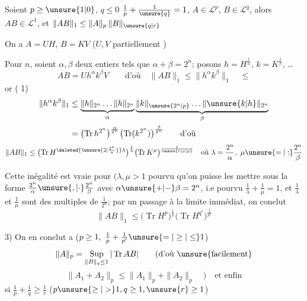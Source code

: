  Soient $p\geq\unsure{1|0}$,
$q\leq0$ \quad $\frac1p+\frac1{\unsure{q}}=1$,
$A\in\mathcal L^p$, $B\in\mathcal L^q$, alors $AB\in\mathcal L^1$, et
$\|AB\|_1\leq\|A\|_p\,\|B\|_{\unsure{q|r}}$

On a $A=UH$, $B=KV$ ($U,V$ partiellement )

Pour  $n$, soient $\alpha,\beta$ deux entiers tels que $\alpha+\beta=2^n$;
posons $h=H^{\frac1\alpha}$, $k=K^{\frac1\beta}$, \ldots
\[
AB=Uh^\alpha k^\beta V\qquad\text{d'où}\quad\|AB\|_1\leq\|h^\alpha k^\beta\|_1\quad\leq
\]
or ( 1)
\[
\begin{aligned}
\|h^\alpha k^\beta\|_1&\leq
\underbrace{\|h\|_{2^n}\ldots\|h\|_{2^n}}_{\alpha}
\underbrace{\|k\|_{\unsure{2^n|p}}\ldots\|\unsure{k|h}\|_{2^n}}_{\beta}\\
&=\bigl(\operatorname{Tr} h^{2^n}\bigr)^{\frac\alpha{2^n}}
\bigl(\operatorname{Tr}(k^{2^n})\bigr)^{\frac\beta{2^n}}\qquad\text{d'où}
\end{aligned}
\]
\[
\|AB\|_1\leq\bigl(\operatorname{Tr}H^{\deleted{\unsure{2|\frac{2^n}{\alpha}}}\lambda}\bigr)^{\frac1\lambda}
\bigl(\operatorname{Tr}K^\mu\bigr)^{\frac1{\unsure{r|\mu|p}}}
\quad\text{où }\lambda=\frac{2^n}{\alpha},\ \mu\unsure{=|:}\frac{2^n}{\beta}
\]

Cette inégalité est vraie pour  $(\lambda,\mu>1$ pourvu qu'on puisse les mettre sous la  forme
$\frac{2^n}{\alpha}\unsure{,|\cdot}\frac{2^n}{\beta}$ avec $\alpha\unsure{+|-}\beta=2^n$,
i.e pourvu $\frac1\lambda+\frac1\mu=1$, 
et $\frac1\lambda$ et $\frac1\mu$ sont des multiples de $\frac1{2^n}$;
par un passage à la limite immédiat, on conclut
\[
\|AB\|_1\leq\bigl(\operatorname{Tr}H^p\bigr)^{\frac1p}
\bigl(\operatorname{Tr}H^{q'}\bigr)^{\frac1{p'}}
\]

3) On en conclut  a ($p\geq1,\ \frac1p+\frac1{p'}\unsure{=|\geq|\leq}1$)
\[
\|A\|_p=\operatorname*{Sup}_{\|B\|_q\leq1}|\operatorname{Tr} AB|\qquad\text{(d'où \unsure{facilement}}
\]
\[
\|A_1+A_2\|_p\leq\|A_1\|_p+\|A_2\|_p\quad)\quad\text{et enfin}
\]
 si $\frac1p+\frac1q\geq\frac1r$ \quad ($p\unsure{\geq|>}1,q\geq1,\unsure{r}\geq1$)
